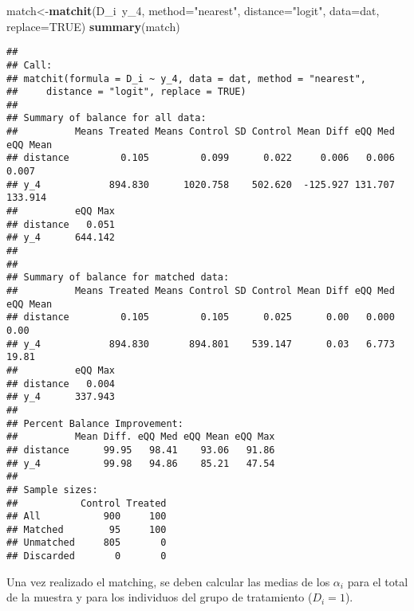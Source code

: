 \documentclass[]{article}
\newenvironment{Shaded}{\begin{snugshade}}{\end{snugshade}}
\newcommand{\KeywordTok}[1]{\textcolor[rgb]{0.13,0.29,0.53}{\textbf{{#1}}}}
\newcommand{\DataTypeTok}[1]{\textcolor[rgb]{0.13,0.29,0.53}{{#1}}}
\newcommand{\DecValTok}[1]{\textcolor[rgb]{0.00,0.00,0.81}{{#1}}}
\newcommand{\StringTok}[1]{\textcolor[rgb]{0.31,0.60,0.02}{{#1}}}
\newcommand{\CommentTok}[1]{\textcolor[rgb]{0.56,0.35,0.01}{\textit{{#1}}}}
\newcommand{\OtherTok}[1]{\textcolor[rgb]{0.56,0.35,0.01}{{#1}}}
\newcommand{\NormalTok}[1]{{#1}}
\begin{document}
\begin{Shaded}
\begin{Highlighting}[]
\NormalTok{match<-}\KeywordTok{matchit}\NormalTok{(D_i~y_4, }\DataTypeTok{method=}\StringTok{"nearest"}\NormalTok{, }\DataTypeTok{distance=}\StringTok{"logit"}\NormalTok{, }\DataTypeTok{data=}\NormalTok{dat, }\DataTypeTok{replace=}\OtherTok{TRUE}\NormalTok{)}
\KeywordTok{summary}\NormalTok{(match)}
\end{Highlighting}
\end{Shaded}

\begin{verbatim}
## 
## Call:
## matchit(formula = D_i ~ y_4, data = dat, method = "nearest", 
##     distance = "logit", replace = TRUE)
## 
## Summary of balance for all data:
##          Means Treated Means Control SD Control Mean Diff eQQ Med eQQ Mean
## distance         0.105         0.099      0.022     0.006   0.006    0.007
## y_4            894.830      1020.758    502.620  -125.927 131.707  133.914
##          eQQ Max
## distance   0.051
## y_4      644.142
## 
## 
## Summary of balance for matched data:
##          Means Treated Means Control SD Control Mean Diff eQQ Med eQQ Mean
## distance         0.105         0.105      0.025      0.00   0.000     0.00
## y_4            894.830       894.801    539.147      0.03   6.773    19.81
##          eQQ Max
## distance   0.004
## y_4      337.943
## 
## Percent Balance Improvement:
##          Mean Diff. eQQ Med eQQ Mean eQQ Max
## distance      99.95   98.41    93.06   91.86
## y_4           99.98   94.86    85.21   47.54
## 
## Sample sizes:
##           Control Treated
## All           900     100
## Matched        95     100
## Unmatched     805       0
## Discarded       0       0
\end{verbatim}

Una vez realizado el matching, se deben calcular las medias de los
$\alpha_{i}$ para el total de la muestra y para los individuos del grupo
de tratamiento ($D_{i}=1$).

\begin{Shaded}
\end{Shaded}
\end{document}
